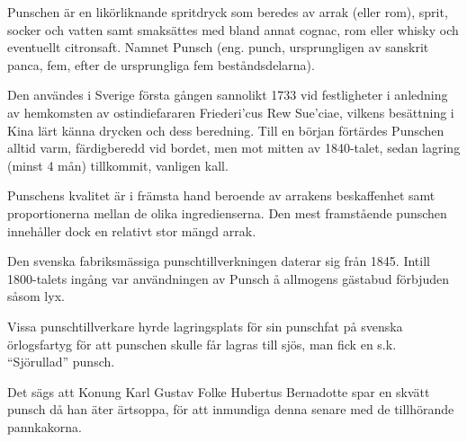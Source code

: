 \vspace{10pt}
\setlength{\parindent}{15pt}
Punschen är en likörliknande spritdryck som beredes av arrak (eller
rom), sprit, socker och vatten samt smaksättes med bland annat cognac,
rom eller whisky och eventuellt citronsaft. Namnet Punsch (eng. punch,
ursprungligen av sanskrit panca, fem, efter de ursprungliga fem
beståndsdelarna).

Den användes i Sverige första gången sannolikt 1733 vid festligheter i
anledning av hemkomsten av ostindiefararen Friederi'cus Rew Sue'ciae,
vilkens besättning i Kina lärt känna drycken och dess beredning. Till
en början förtärdes Punschen alltid varm, färdigberedd vid bordet, men
mot mitten av 1840-talet, sedan lagring (minst 4 mån) tillkommit,
vanligen kall.

Punschens kvalitet är i främsta hand beroende av arrakens beskaffenhet
samt proportionerna mellan de olika ingredienserna. Den mest
framstående punschen innehåller dock en relativt stor mängd arrak.

Den svenska fabriksmässiga punschtillverkningen daterar sig från
1845. Intill 1800-talets ingång var användningen av Punsch å allmogens
gästabud förbjuden såsom lyx.

Vissa punschtillverkare hyrde lagringsplats för sin punschfat på
svenska örlogsfartyg för att punschen skulle får lagras till sjös, man
fick en s.k. ``Sjörullad'' punsch.

Det sägs att Konung Karl Gustav Folke Hubertus Bernadotte spar en
skvätt punsch då han äter ärtsoppa, för att inmundiga denna senare med
de tillhörande pannkakorna.
\setlength{\parindent}{0pt}
